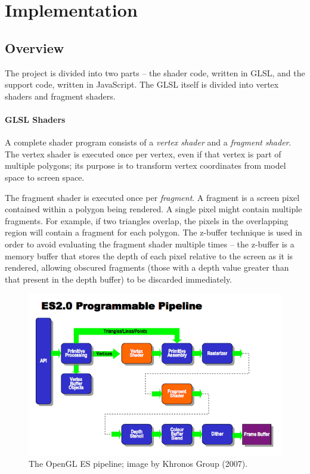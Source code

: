 \documentclass[12pt,twoside,notitlepage]{report}
\begin{document}
\chapter{Implementation}
\section{Overview}

The project is divided into two parts -- the shader code, written in GLSL, and the support code, written in JavaScript. The GLSL itself is divided into vertex shaders and fragment shaders.

\subsubsection{GLSL Shaders}

A complete shader program consists of a \textit{vertex shader} and a \textit{fragment shader}. The vertex shader is executed once per vertex, even if that vertex is part of multiple polygons; its purpose is to transform vertex coordinates from model space to screen space.

The fragment shader is executed once per \textit{fragment}. A fragment is a screen pixel contained within a polygon being rendered. A single pixel might contain multiple fragments. For example, if two triangles overlap, the pixels in the overlapping region will contain a fragment for each polygon. The z-buffer technique is used in order to avoid evaluating the fragment shader multiple times -- the z-buffer is a memory buffer that stores the depth of each pixel relative to the screen as it is rendered, allowing obscured fragments (those with a depth value greater than that present in the depth buffer) to be discarded immediately.

\begin{figure}[h!]
\centering
\includegraphics{glespipeline}
\caption{The OpenGL ES pipeline; image by Khronos Group (2007).}
\label{fig:pipeline}
\end{figure}
\end{document}
